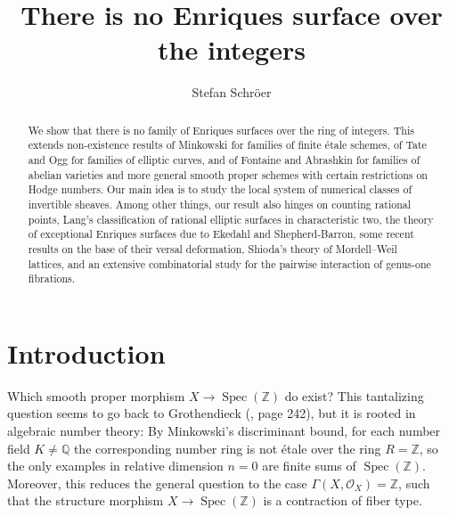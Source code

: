 \documentclass[oneside, 12pt]{amsart}
\newcommand\mylabel[1]{\label{#1}\marginpar{\vspace{-1ex}\medskip\medskip\footnotesize \tt #1}}
\renewcommand\mylabel[1]{\label{#1}}
\theoremstyle{definition}
\theoremstyle{remark}
\newcommand{\ZZ}{\mathbb{Z}}
\newcommand{\QQ}{\mathbb{Q}}
\renewcommand{\O}{\mathscr{O}}
\newcommand{\ra}{\rightarrow}
\newcommand{\Spec}{\operatorname{Spec}}
\begin{document}
\title[Enriques surfaces over the integers]
      {There is no  Enriques surface over the integers}

\author[Stefan Schr\"oer]{Stefan Schr\"oer}
\address{Mathematisches Institut, Heinrich-Heine-Universit\"at,
40204 D\"usseldorf, Germany}
\curraddr{}



\begin{abstract}
We show that there is no    family of Enriques surfaces over the ring of integers.
This extends   non-existence results of Minkowski for   families of finite \'etale schemes,
of Tate and Ogg for families of elliptic curves, and of Fontaine and Abrashkin for families of abelian varieties
and more general smooth proper schemes with certain  restrictions on   Hodge numbers.
Our main idea is to study the local system of numerical classes of invertible sheaves.
Among other things, our result also hinges on counting rational points, Lang's classification of   
rational elliptic surfaces in characteristic two,  the theory of exceptional Enriques surfaces due to 
Ekedahl and Shepherd-Barron, some recent results on the base of their versal deformation, Shioda's theory of Mordell--Weil lattices,
and an extensive  combinatorial study for  the pairwise interaction of    genus-one fibrations.
\end{abstract}

\maketitle
\tableofcontents

 

\section*{Introduction}
\mylabel{Introduction}

Which   smooth proper morphism $X\ra\Spec(\ZZ)$ do exist?  This tantalizing question seems to go  back to 
Grothendieck (\cite{Mazur 1986}, page 242), but it is rooted in algebraic number theory:
By   Minkowski's discriminant bound, for each number field $K\neq \QQ$ the corresponding
number ring  is not   \'etale over the ring $R=\ZZ$, so the only examples
in relative dimension $n=0$ are finite sums of $\Spec(\ZZ)$. Moreover, this reduces the general question  to  the
case $\Gamma(X,\O_X)=\ZZ$, such that the structure morphism  $X\ra\Spec(\ZZ)$ is a   contraction of fiber type.
\end{document}
